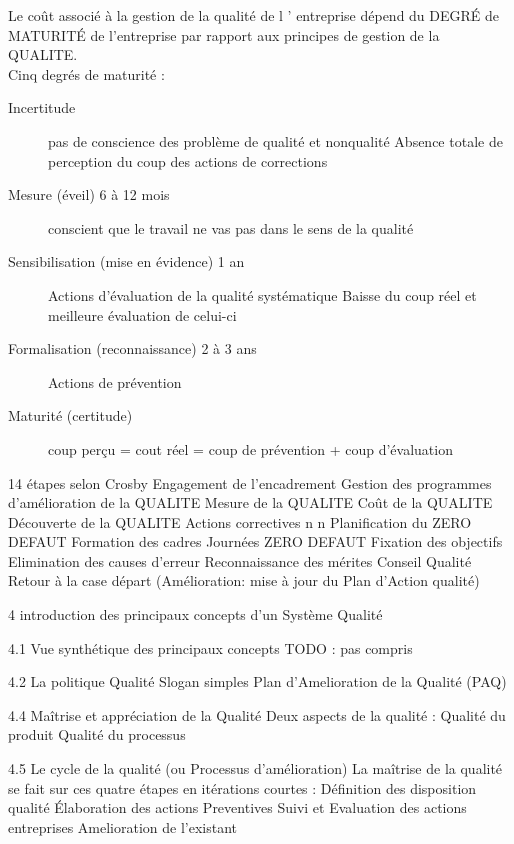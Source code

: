 \begin{itemize}
Le coût associé à la gestion de la qualité de l ' entreprise dépend du DEGRÉ de MATURITÉ de l'entreprise par rapport aux principes de gestion de la QUALITE.\\
Cinq degrés de maturité :
\begin{description}
\item[Incertitude]
	\begin{itemize}
pas de conscience des problème de qualité et nonqualité
Absence totale de perception du coup des actions de corrections
	\end{itemize}
\item[Mesure (éveil) 6 à 12 mois]
conscient que le travail ne vas pas dans le sens de la qualité
\item[Sensibilisation (mise en évidence) 1 an]
Actions d’évaluation de la qualité systématique
Baisse du coup réel et meilleure évaluation de celui-ci
\item[Formalisation (reconnaissance) 2 à 3 ans]
Actions de prévention
\item[Maturité (certitude)]
coup perçu = cout réel = coup de prévention + coup d’évaluation
\end{description}


14 étapes selon Crosby 
Engagement de l'encadrement
Gestion des programmes d'amélioration de la QUALITE
Mesure de la QUALITE
Coût de la QUALITE
Découverte de la QUALITE
Actions correctives n n
Planification du ZERO DEFAUT
Formation des cadres 
Journées ZERO DEFAUT 
Fixation des objectifs
Elimination des causes d'erreur
Reconnaissance des mérites
Conseil Qualité
Retour à la case départ (Amélioration: mise à jour du Plan d'Action qualité)





4 introduction des principaux concepts d'un Système Qualité

4.1 Vue synthétique des principaux concepts
TODO : pas compris

4.2 La politique Qualité
Slogan simples
Plan d’Amelioration de la Qualité (PAQ)

4.4 Maîtrise et appréciation de la Qualité
Deux aspects de la qualité :
Qualité du produit
Qualité du processus

4.5 Le cycle de la qualité (ou Processus d'amélioration)
La maîtrise de la qualité se fait sur ces quatre étapes en itérations courtes : 
Définition des disposition qualité
Élaboration des actions Preventives
Suivi et Evaluation des actions entreprises
Amelioration de l’existant



\end{itemize}
